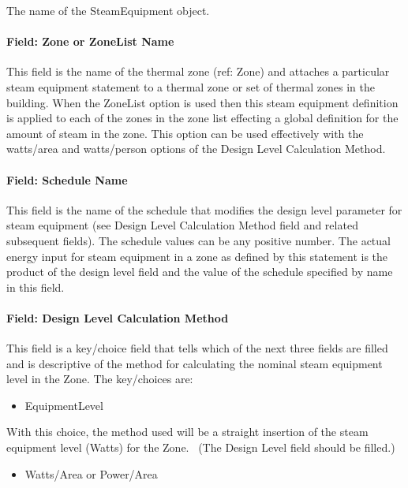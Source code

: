 The name of the SteamEquipment object.

\paragraph{Field: Zone or ZoneList Name}\label{field-zone-or-zonelist-name-5}

This field is the name of the thermal zone (ref: Zone) and attaches a particular steam equipment statement to a thermal zone or set of thermal zones in the building. When the ZoneList option is used then this steam equipment definition is applied to each of the zones in the zone list effecting a global definition for the amount of steam in the zone. This option can be used effectively with the watts/area and watts/person options of the Design Level Calculation Method.

\paragraph{Field: Schedule Name}\label{field-schedule-name-4-000}

This field is the name of the schedule that modifies the design level parameter for steam equipment (see Design Level Calculation Method field and related subsequent fields). The schedule values can be any positive number. The actual energy input for steam equipment in a zone as defined by this statement is the product of the design level field and the value of the schedule specified by name in this field.

\paragraph{Field: Design Level Calculation Method}\label{field-design-level-calculation-method-4}

This field is a key/choice field that tells which of the next three fields are filled and is descriptive of the method for calculating the nominal steam equipment level in the Zone. The key/choices are:

\begin{itemize}
\tightlist
\item
  EquipmentLevel
\end{itemize}

With this choice, the method used will be a straight insertion of the steam equipment level (Watts) for the Zone.~ (The Design Level field should be filled.)

\begin{itemize}
\tightlist
\item
  Watts/Area or Power/Area
\end{itemize}

